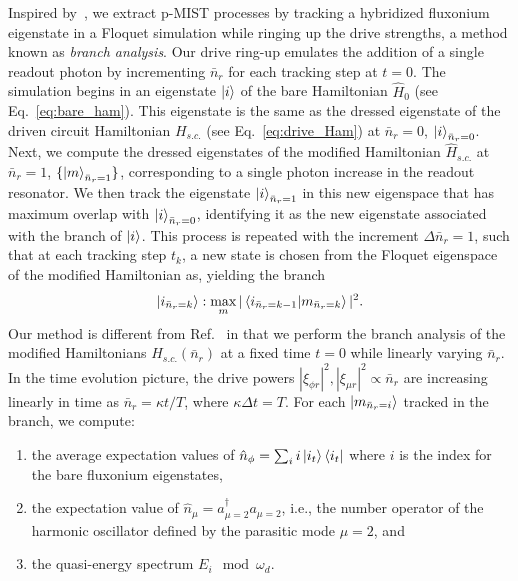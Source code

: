 \documentclass[%
reprint,
superscriptaddress,
 amsmath,amssymb,
 aps,
 prx,
longbibliography,
floatfix,
]{revtex4-2}
\begin{document}
Inspired by~\cite{dumas2024unified,cohen2023reminiscence}, we extract p-MIST processes by tracking a hybridized fluxonium eigenstate in a Floquet simulation while ringing up the drive strengths, a method known as \emph{branch analysis}. Our drive ring-up emulates the addition of a single readout photon by incrementing $\bar n_r$ for each tracking step at $t=0$. The simulation begins in an eigenstate $\ket{i}$ of the bare Hamiltonian $\hat{H}_0$ (see Eq.~\ref{eq:bare_ham}). This eigenstate is the same as the dressed eigenstate of the driven circuit Hamiltonian $H_{s.c.}$ (see Eq.~\ref{eq:drive_Ham}) at $\bar n_r=0$, $\ket{i}_{\bar n_r=0}$. Next, we compute the dressed eigenstates of the modified Hamiltonian $\hat{H}_{s.c.}$ at $\bar n_r=1$, $\{\ket{m}_{\bar n_r=1}\}$, corresponding to a single photon increase in the readout resonator. We then track the eigenstate $\ket{i}_{\bar n_r=1}$ in this new eigenspace that has maximum overlap with $\ket{i}_{\bar n_r=0}$, identifying it as the new eigenstate associated with the branch of $\ket{i}$. This process is repeated with the increment $\Delta \bar n_r=1$, such that at each tracking step $t_k$, a new state is chosen from the Floquet eigenspace of the modified Hamiltonian as, yielding the branch
\begin{align}
\ket{i_{\bar n_r=k}}:\max_{m}|\braket{i_{\bar n_r=k-1}|{m}_{\bar n_r=k}}|^2.   
\end{align}
Our method is different from Ref.~\cite{dumas2024unified,cohen2023reminiscence} in that we perform the branch analysis of the modified Hamiltonians $H_{s.c.}(\bar n_r)$ at a fixed time $t=0$ while linearly varying $\bar n_r$. In the time evolution picture, the drive powers $|\xi_{\phi r}|^2,|\xi_{\mu r}|^2 \propto \bar n_r$ are increasing linearly in time as $\bar n_r= \kappa t/T$, where $\kappa \Delta t=T$. For each $\ket{m_{\bar n_r=i}}$ tracked in the branch, we compute:
\begin{enumerate}
    \item the average expectation values of $\hat n_\phi=\sum_i i\ket{i_t}\bra{i_t}$ where $i$ is the index for the bare fluxonium eigenstates,
    \item the expectation value of $\hat n_\mu=a_{\mu=2}^\dagger a_{\mu=2}$, i.e., the number operator of the harmonic oscillator defined by the parasitic mode $\mu=2$, and 
    \item the quasi-energy spectrum $E_i\mod \omega_d$.
\end{enumerate}
\end{document}
